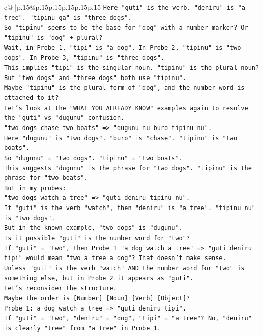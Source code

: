 \documentclass{article}
\begin{document}
{\begin{supertabular}{c@{$\;$}|p{.15\linewidth}@{}p{.15\linewidth}p{.15\linewidth}p{.15\linewidth}p{.15\linewidth}p{.15\linewidth}}
{{{\texttt{Here "guti" is the verb. "deniru" is "a tree". "tipinu ga" is "three dogs".} \\
\texttt{So "tipinu" seems to be the base for "dog" with a number marker? Or "tipinu" is "dog" + plural?} \\
\texttt{Wait, in Probe 1, "tipi" is "a dog". In Probe 2, "tipinu" is "two dogs". In Probe 3, "tipinu" is "three dogs".} \\
\texttt{This implies "tipi" is the singular noun. "tipinu" is the plural noun? But "two dogs" and "three dogs" both use "tipinu".} \\
\texttt{Maybe "tipinu" is the plural form of "dog", and the number word is attached to it?} \\
\texttt{Let's look at the "WHAT YOU ALREADY KNOW" examples again to resolve the "guti" vs "dugunu" confusion.} \\
\texttt{"two dogs chase two boats" => "dugunu nu buro tipinu nu".} \\
\texttt{Here "dugunu" is "two dogs". "buro" is "chase". "tipinu" is "two boats".} \\
\texttt{So "dugunu" = "two dogs". "tipinu" = "two boats".} \\
\texttt{This suggests "dugunu" is the phrase for "two dogs". "tipinu" is the phrase for "two boats".} \\
\texttt{But in my probes:} \\
\texttt{"two dogs watch a tree" => "guti deniru tipinu nu".} \\
\texttt{If "guti" is the verb "watch", then "deniru" is "a tree". "tipinu nu" is "two dogs".} \\
\texttt{But in the known example, "two dogs" is "dugunu".} \\
\texttt{Is it possible "guti" is the number word for "two"?} \\
\texttt{If "guti" = "two", then Probe 1 "a dog watch a tree" => "guti deniru tipi" would mean "two a tree a dog"? That doesn't make sense.} \\
\texttt{Unless "guti" is the verb "watch" AND the number word for "two" is something else, but in Probe 2 it appears as "guti".} \\
\texttt{Let's reconsider the structure.} \\
\texttt{Maybe the order is {[}Number{]} {[}Noun{]} {[}Verb{]} {[}Object{]}?} \\
\texttt{Probe 1: a dog watch a tree => "guti deniru tipi".} \\
\texttt{If "guti" = "two", "deniru" = "dog", "tipi" = "a tree"? No, "deniru" is clearly "tree" from "a tree" in Probe 1.} \\
}}}
\end{supertabular}}
\end{document}
